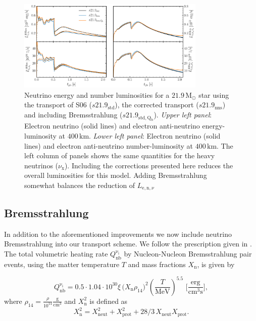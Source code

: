 \documentclass[fleqn,usenatbib]{mnras}
\begin{document}
\begin{figure}
\centering
\includegraphics[width=0.8\textwidth]{./pic/s21_9_trans_tests.pdf}
\caption{Neutrino energy and number luminosities for a $21.9\,\mathrm{M_{\odot}}$ star using the transport of S06 ($s21.9_{\mathrm{std}}$), the corrected transport ($s21.9_{\mathrm{nns}}$) and including Bremsstrahlung ($s21.9_{\mathrm{std,Q_b}}$). \textit{Upper left panel}: Electron neutrino (solid lines) and electron anti-neutrino energy-luminosity at $400\,\mathrm{km}$. \textit{Lower left panel}: Electron neutrino (solid lines) and electron anti-neutrino number-luminosity at $400\,\mathrm{km}$. The left column of panels shows the same quantities for the heavy neutrinos ($\nu_{\mathrm{x}}$). Including the corrections presented here reduces the overall luminosities for this model. Adding Bremsstrahlung somewhat balances the reduction of $L_{\mathrm{e,n},\nu}$}
\label{fig:s21.9_tras}
\end{figure}

\subsection{Bremsstrahlung}

In addition to the aforementioned improvements we now include neutrino Bremsstrahlung into our transport scheme. We follow the prescription given in \cite{Burrows2006}.
The total volumetric heating rate $ Q_{\mathrm{nb}}^{\mathrm{\nu_i}}$ by Nucleon-Nucleon Bremsstrahlung pair events, using the matter temperature $T$ and mass fractions $X_{\mathrm{n}}$, is given by

\begin{equation}
Q_{\mathrm{nb}}^{\mathrm{\nu_i}} = 0.5\cdot 1.04\cdot 10^{30} \xi \, \big(X_{\mathrm{n}}\rho_{14}\big)^2 (\frac{T}{\mathrm{MeV}})^{5.5} \,\, \Big[\frac{\mathrm{erg}}{\mathrm{cm^3s}}\Big],
\end{equation}
where $\rho_{14} = \frac{\rho}{10^{14}} \mathrm{\frac{g}{cm^3}} $
and $X_{\mathrm{n}}^2$ is defined as
\begin{equation*}
X_{\mathrm{n}}^2 = X_{\mathrm{neut}}^2 + X_{\mathrm{prot}}^2 + 28/3\, X_{\mathrm{neut}}X_{\mathrm{prot}}.
\end{equation*}
\end{document}
